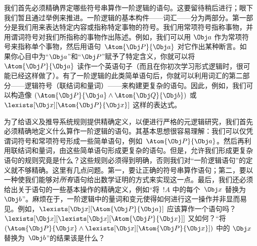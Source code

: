 \documentclass[../../../include/open-logic-section]{subfiles}
\begin{document}


我们首先必须精确界定哪些符号串算作一阶逻辑的语句。这要留待稍后进行；眼下我们暂且通过举例来推进。一阶逻辑的基本构件——词汇——分为两部分。第一部分是我们用来表达特定内容或指称特定事物的符号。我们用常项符号指称事物，并用谓词符号对我们所指称的事物作出陈述。例如，我们可以用 $\Obj a$ 作为常项符号来指称单个事物，然后用语句~$\Atom{\Obj P}{\Obj a}$ 对它作出某种断言。如果你心目中为“$\Obj a$”和“$\Obj P$”赋予了特定含义，你就可以将 $\Atom{\Obj P}{\Obj a}$ 读作一个英语句子（而且在你初次学习形式逻辑时，很可能已经这样做了）。有了一阶逻辑的此类简单语句后，你就可以利用词汇的第二部分——逻辑符号（联结词和量词）——来构建更复杂的语句。因此，例如，我们可以构造像 $(\Atom{\Obj P}{\Obj a} \land \Atom{\Obj Q}{\Obj b})$ 或~$\lexists[\Obj x][\Atom{\Obj P}{\Obj x}]$ 这样的表达式。

为了给语义及推导系统规则提供精确定义，以便进行严格的元逻辑研究，我们首先必须精确地定义什么算作一阶逻辑的语句。其基本思想很容易理解：我们可以仅凭谓词符号和常项符号形成一些简单语句，例如~$\Atom{\Obj P}{\Obj a}$。然后再利用联结词和量词，由这些简单语句形成更复杂的语句。但是，允许我们形成更复杂语句的规则究竟是什么？这些规则必须得到明确，否则我们对“一阶逻辑语句”的定义就不够精确。这里有几点问题。第一，要让正确的符号串算作语句；第二，要以一种使我们能够对\emph{所有}语句给出数学证明的方式来实现这一点。最后，我们还必须给出关于语句的一些基本操作的精确定义，例如“将~$!A$ 中的每个~$\Obj x$ 替换为~$\Obj b$”。麻烦在于，一阶逻辑中的量词和变元使得如何进行这一操作并非显而易见。例如，$\lexists[\Obj
x][\Atom{\Obj P}{\Obj a}]$ 应该算作一个语句吗？$\lexists[\Obj x][\lexists[\Obj x][\Atom{\Obj P}{\Obj x}]]$ 又如何？“将 $(\Atom{\Obj
P}{\Obj x} \land \lexists[\Obj x][\Atom{\Obj P}{\Obj x}])$ 中的 $\Obj x$ 替换为~$\Obj b$”的结果该是什么？
\end{document}
